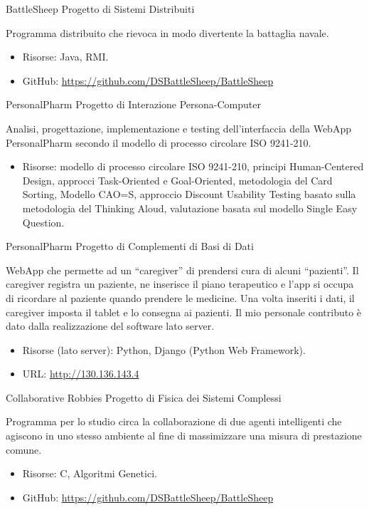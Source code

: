 {BattleSheep}
{Progetto di Sistemi Distribuiti}
{}
{}
{Programma distribuito che rievoca in modo divertente la battaglia navale.
\begin{itemize}
	\item Risorse: Java, RMI.
	\item GitHub: \url{https://github.com/DSBattleSheep/BattleSheep}
\end{itemize}}

{PersonalPharm}
{Progetto di Interazione Persona-Computer}
{}
{}
{Analisi, progettazione, implementazione e testing dell'interfaccia della WebApp
PersonalPharm secondo il modello di processo circolare ISO 9241-210.
\begin{itemize}
	\item Risorse: modello di processo circolare ISO 9241-210, principi
	Human-Centered Design, approcci Task-Oriented e Goal-Oriented, metodologia
	del Card Sorting, Modello CAO=S, approccio Discount Usability Testing basato
	sulla metodologia del Thinking Aloud, valutazione basata sul modello Single
	Easy Question.
\end{itemize}}

{PersonalPharm}
{Progetto di Complementi di Basi di Dati}
{}
{}
{WebApp che permette ad un ``caregiver'' di prendersi cura di alcuni
``pazienti''.\newline
Il caregiver registra un paziente, ne inserisce il piano terapeutico e l'app si
occupa di ricordare al paziente quando prendere le medicine. Una volta inseriti
i dati, il caregiver imposta il tablet e lo consegna ai pazienti.\newline
Il mio personale contributo è dato dalla realizzazione del software lato server.
\begin{itemize}
	\item Risorse (lato server): Python, Django (Python Web Framework).
	\item URL: \url{http://130.136.143.4}
\end{itemize}}

{Collaborative Robbies}
{Progetto di Fisica dei Sistemi Complessi}
{}
{}
{Programma per lo studio circa la collaborazione di due agenti intelligenti che
agiscono in uno stesso ambiente al fine di massimizzare una misura di
prestazione comune.
\begin{itemize}
	\item Risorse: C, Algoritmi Genetici.
	\item GitHub: \url{https://github.com/DSBattleSheep/BattleSheep}
\end{itemize}}
